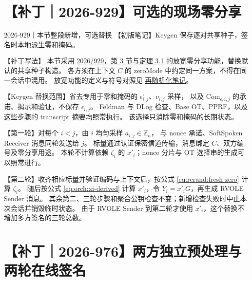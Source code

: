 \section{【补丁｜2026-929】可选的现场零分享}
\label{sec:orch:fresh-zero}

\begin{patchnote}{2026-929｜本节整段新增，可选替换}
【初版笔记】Keygen 保存逐对共享种子，签名时本地派生零和掩码。

【补丁写法】
本节采用 \href{https://eprint.iacr.org/2026/929.pdf}{2026/929，第 3 节与定理 3.1}
的放宽零分享功能，替换默认的共享种子构造。
各方须在上下文 $C$ 的 $\mathrm{zeroMode}$ 中约定同一方案，不得在同一会话中混用。
放宽功能的定义与符号对照见 \hyperref[sec:rerand:relaxed-zero]{再随机化笔记}。

【Keygen 替换范围】省去专用于零和掩码的 $\epsilon^\circ_{i,j}$、$\nu_{i,j}$ 采样，
以及 $\mathrm{Com}_{\epsilon,i,j}$ 的承诺、揭示和验证，不保存 $\epsilon_{i,j}$。
Feldman 与 DLog 检查、Base OT、PPRF，以及这些步骤的 transcript 摘要均照常执行。
该选择只消除零和掩码的长期状态。

【第一轮】对每个 $i<j$，由 $i$ 均匀采样 $a_{i,j}\in\mathbb Z_n$，
与 nonce 承诺、SoftSpoken Receiver 消息同轮发送给 $j$。
标量通过认证保密信道传输，消息绑定 $C$、双方编号及零分享用途。
本轮不计算依赖 $\zeta_i$ 的 $x'_i$；nonce 分片与 OT 选择串的生成可以照常进行。

【第二轮】收齐相应标量并验证编码与上下文后，按公式 \eqref{eq:rerand:fresh-zero} 计算 $\zeta_i$。
随后按公式 \eqref{eq:orch:xi-derived} 计算 $x'_i$，令 $Y_i=x'_iG$，再生成 RVOLE Sender 消息。
其余第二、三轮步骤和聚合公钥检查不变；新增检查失败时中止本次会话并销毁临时状态。
由于 RVOLE Sender 到第二轮才使用 $x'_i$，这个替换不增加多方签名的三轮总数。
\end{patchnote}

\section{【补丁｜2026-976】两方独立预处理与两轮在线签名}
\label{sec:orch:two-party-2026}

